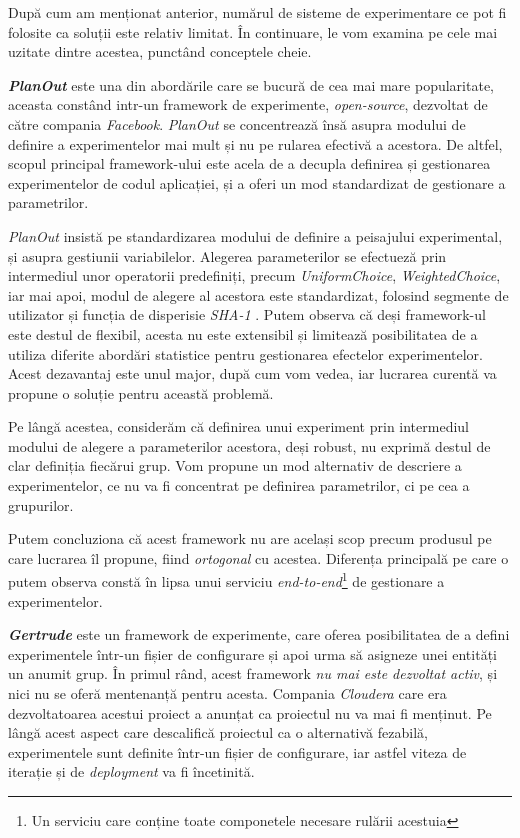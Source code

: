 După cum am menționat anterior, numărul de sisteme de experimentare ce pot fi folosite ca soluții este relativ limitat. În continuare, le vom examina pe cele mai uzitate dintre acestea, punctând conceptele cheie.

\textit{\textbf{PlanOut}} este una din abordările care se bucură de cea mai mare popularitate, aceasta constând intr-un framework de experimente, \textit{open-source}, dezvoltat de către compania \textit{Facebook}. \textit{PlanOut} se concentrează însă asupra modului de definire a experimentelor mai mult și nu pe rularea efectivă a acestora. De altfel, scopul principal framework-ului este acela de a decupla definirea și gestionarea experimentelor de codul aplicației, și a oferi un mod standardizat de gestionare a parametrilor. 

\textit{PlanOut} insistă pe standardizarea modului de definire a peisajului experimental, și asupra gestiunii variabilelor. Alegerea parameterilor se efectueză prin intermediul unor operatorii predefiniți, precum \textit{UniformChoice}, \textit{WeightedChoice}, iar mai apoi, modul de alegere al acestora este standardizat, folosind segmente de utilizator și funcția de disperisie \textit{SHA-1}  \cite{planout}. Putem observa că deși framework-ul este destul de flexibil, acesta nu este extensibil și limitează posibilitatea de a utiliza diferite abordări statistice pentru gestionarea efectelor experimentelor. Acest dezavantaj este unul major, după cum vom vedea, iar lucrarea curentă va propune o soluție pentru această problemă. 

Pe lângă acestea, considerăm că definirea unui experiment prin intermediul modului de alegere a parameterilor acestora, deși robust, nu exprimă destul de clar definiția fiecărui grup. Vom propune un mod alternativ de descriere a experimentelor, ce nu va fi concentrat pe definirea parametrilor, ci pe cea a grupurilor. 

Putem concluziona că acest framework nu are același scop precum produsul pe care lucrarea îl propune, fiind \textit{ortogonal} cu acestea. Diferența principală pe care o putem observa constă în lipsa unui serviciu \textit{end-to-end}\footnote{Un serviciu care conține toate componetele necesare rulării acestuia} de gestionare a experimentelor.

\textbf{\textit{Gertrude}} este un framework de experimente, care oferea posibilitatea de a defini experimentele într-un fișier de configurare și apoi urma să asigneze unei entități un anumit grup. În primul rând, acest framework \textit{nu mai este dezvoltat activ}, și nici nu se oferă mentenanță pentru acesta. Compania \textit{Cloudera} care era dezvoltatoarea acestui proiect a anunțat ca proiectul nu va mai fi menținut. Pe lângă acest aspect care descalifică proiectul ca o alternativă fezabilă, experimentele sunt definite într-un fișier de configurare, iar astfel viteza de iterație și de \textit{deployment} va fi încetinită. 

